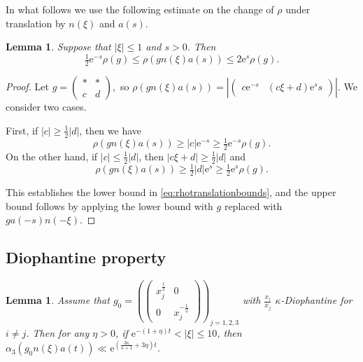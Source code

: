 \documentclass[12pt]{amsart}
\newtheorem{lem}[thm]{Lemma}
\theoremstyle{definition}
\theoremstyle{remark}
\numberwithin{equation}{section}
\newcommand{\e}{\mathrm{e}}
\begin{document}
In what follows we use the following estimate on the change of $\rho$ under translation by $n(\xi)$ and $a(s)$.
\begin{lem}
  \label{lem:rhotransbounds}
  Suppose that $|\xi|\leq 1$ and $s > 0$.
  Then
  \begin{equation}
    \label{eq:rhotranslationbounds}
    \tfrac{1}{2 } \e^{-s}  \rho(g) \leq \rho(g n(\xi)a(s)) \leq 2 \e^s \rho(g). 
  \end{equation}
\end{lem}

\begin{proof}
  Let $g =
  \begin{pmatrix}
    * & * \\
    c & d
  \end{pmatrix}
  ,$ so $\rho(gn(\xi)a(s)) = |
  \begin{pmatrix}
    c\e^{-s} & (c\xi + d) \e^ss
  \end{pmatrix}
  |$.
  We consider two cases.

  First, if $|c| \geq \tfrac{1}{2} |d|$, then we have
  \begin{equation}
    \label{eq:rholowerboundc}
    \rho(gn(\xi)a(s)) \geq |c| \e^{-s} \geq \tfrac{1}{2} \e^{-s} \rho(g). 
  \end{equation}
  On the other hand, if $|c| \leq \tfrac{1}{2} |d|$, then $|c\xi + d| \geq \tfrac{1}{2}|d|$ and
  \begin{equation}
    \label{eq:rholowerboundd}
    \rho(gn(\xi)a(s)) \geq \tfrac{1}{2} |d| \e^s \geq \tfrac{1}{2} \e^s\rho(g). 
  \end{equation}
  
  This establishes the lower bound in \eqref{eq:rhotranslationbounds}, and the upper bound follows by applying the lower bound with $g$ replaced with $ga(-s)n(-\xi)$. 
\end{proof}

\subsection{Diophantine property}
\label{sec:Diophantine}

\begin{lem}
  \label{lem:alpha3supbound}
  Assume that $g_0 = \left( \begin{pmatrix}   x_j^{\frac{1}{2}} & 0 \\
    0 & x_j^{-\frac{1}{2}}
  \end{pmatrix}
  \right)_{\!\! j=1,2,3}$ with $\tfrac{x_i}{x_j}$ $\kappa$-Diophantine for $i\neq j$.
  Then for any $\eta > 0$, if $\e^{-(1+\eta) t} < |\xi| \leq 10$, then $\alpha_3(g_0n(\xi) a(t)) \ll \e^{(\frac{3\kappa}{\kappa + 1} + 3\eta)t }$.
\end{lem}
\end{document}
